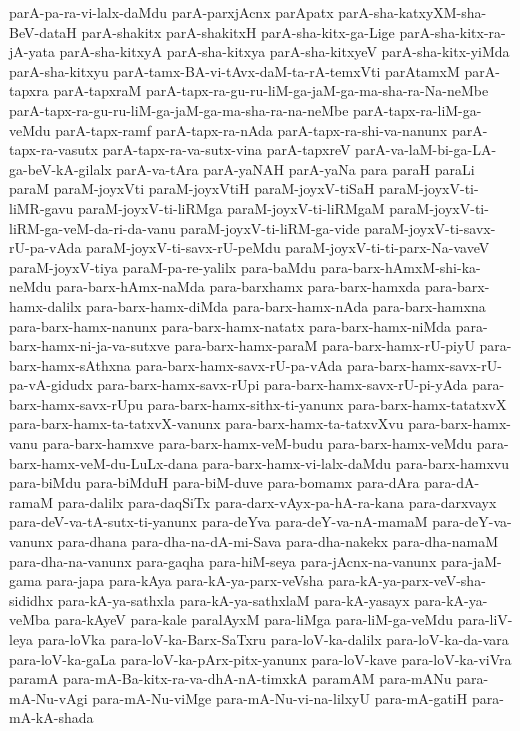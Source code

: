 {parA-pa-ra-vi-lalx-daMdu
parA-parxjAcnx
parApatx
parA-sha-katxyXM-sha-BeV-dataH
parA-shakitx
parA-shakitxH
parA-sha-kitx-ga-Lige
parA-sha-kitx-ra-jA-yata
parA-sha-kitxyA
parA-sha-kitxya
parA-sha-kitxyeV
parA-sha-kitx-yiMda
parA-sha-kitxyu
parA-tamx-BA-vi-tAvx-daM-ta-rA-temxVti
parAtamxM
parA-tapxra
parA-tapxraM
parA-tapx-ra-gu-ru-liM-ga-jaM-ga-ma-sha-ra-Na-neMbe
parA-tapx-ra-gu-ru-liM-ga-jaM-ga-ma-sha-ra-na-neMbe
parA-tapx-ra-liM-ga-veMdu
parA-tapx-ramf
parA-tapx-ra-nAda
parA-tapx-ra-shi-va-nanunx
parA-tapx-ra-vasutx
parA-tapx-ra-va-sutx-vina
parA-tapxreV
parA-va-laM-bi-ga-LA-ga-beV-kA-gilalx
parA-va-tAra
parA-yaNAH
parA-yaNa
para
paraH
paraLi
paraM
paraM-joyxVti
paraM-joyxVtiH
paraM-joyxV-tiSaH
paraM-joyxV-ti-liMR-gavu
paraM-joyxV-ti-liRMga
paraM-joyxV-ti-liRMgaM
paraM-joyxV-ti-liRM-ga-veM-da-ri-da-vanu
paraM-joyxV-ti-liRM-ga-vide
paraM-joyxV-ti-savx-rU-pa-vAda
paraM-joyxV-ti-savx-rU-peMdu
paraM-joyxV-ti-ti-parx-Na-vaveV
paraM-joyxV-tiya
paraM-pa-re-yalilx
para-baMdu
para-barx-hAmxM-shi-ka-neMdu
para-barx-hAmx-naMda
para-barxhamx
para-barx-hamxda
para-barx-hamx-dalilx
para-barx-hamx-diMda
para-barx-hamx-nAda
para-barx-hamxna
para-barx-hamx-nanunx
para-barx-hamx-natatx
para-barx-hamx-niMda
para-barx-hamx-ni-ja-va-sutxve
para-barx-hamx-paraM
para-barx-hamx-rU-piyU
para-barx-hamx-sAthxna
para-barx-hamx-savx-rU-pa-vAda
para-barx-hamx-savx-rU-pa-vA-gidudx
para-barx-hamx-savx-rUpi
para-barx-hamx-savx-rU-pi-yAda
para-barx-hamx-savx-rUpu
para-barx-hamx-sithx-ti-yanunx
para-barx-hamx-tatatxvX
para-barx-hamx-ta-tatxvX-vanunx
para-barx-hamx-ta-tatxvXvu
para-barx-hamx-vanu
para-barx-hamxve
para-barx-hamx-veM-budu
para-barx-hamx-veMdu
para-barx-hamx-veM-du-LuLx-dana
para-barx-hamx-vi-lalx-daMdu
para-barx-hamxvu
para-biMdu
para-biMduH
para-biM-duve
para-bomamx
para-dAra
para-dA-ramaM
para-dalilx
para-daqSiTx
para-darx-vAyx-pa-hA-ra-kana
para-darxvayx
para-deV-va-tA-sutx-ti-yanunx
para-deYva
para-deY-va-nA-mamaM
para-deY-va-vanunx
para-dhana
para-dha-na-dA-mi-Sava
para-dha-nakekx
para-dha-namaM
para-dha-na-vanunx
para-gaqha
para-hiM-seya
para-jAcnx-na-vanunx
para-jaM-gama
para-japa
para-kAya
para-kA-ya-parx-veVsha
para-kA-ya-parx-veV-sha-sididhx
para-kA-ya-sathxla
para-kA-ya-sathxlaM
para-kA-yasayx
para-kA-ya-veMba
para-kAyeV
para-kale
paralAyxM
para-liMga
para-liM-ga-veMdu
para-liV-leya
para-loVka
para-loV-ka-Barx-SaTxru
para-loV-ka-dalilx
para-loV-ka-da-vara
para-loV-ka-gaLa
para-loV-ka-pArx-pitx-yanunx
para-loV-kave
para-loV-ka-viVra
paramA
para-mA-Ba-kitx-ra-va-dhA-nA-timxkA
paramAM
para-mANu
para-mA-Nu-vAgi
para-mA-Nu-viMge
para-mA-Nu-vi-na-lilxyU
para-mA-gatiH
para-mA-kA-shada
}

